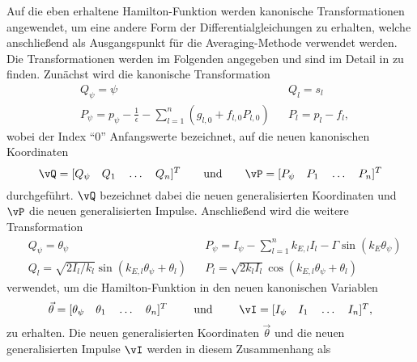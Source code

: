 %
%
%
Auf die eben erhaltene Hamilton-Funktion werden kanonische Transformationen angewendet, um eine andere Form der Differentialgleichungen zu erhalten,
welche anschließend als Ausgangspunkt für die Averaging-Methode verwendet werden.
Die Transformationen werden im Folgenden angegeben und sind im Detail in \cite{Mayet:Tautochronic} zu finden.
Zunächst wird die kanonische Transformation
%
%
\begin{align}
	&Q_{\psi} = \psi   																																									& & Q_l = s_l \label{eq:HamiltonErsteKanonischeTrafoGl1} \\
	&P_{\psi} = p_{\psi} - \frac{1}{\epsilon} - \sum_{l=1}^n \left(g_{l,0} + f_{l,0} P_{l,0} \right)		& & P_l = p_l - f_l,
	\label{eq:HamiltonErsteKanonischeTrafoGl2}
\end{align}
wobei der Index "`0"' Anfangswerte bezeichnet, auf die neuen kanonischen Koordinaten
\begin{equation}
	\vQ = [Q_{\psi} \quad Q_1 \quad \dots \quad Q_n]^T 	\qquad 	\text{und} 	\qquad 	\vP = [P_{\psi} \quad P_1 \quad \dots \quad P_n]^T
	\label{eq:HamiltonErsteKanonischeTrafoNeueVariablen}
\end{equation}
durchgeführt.
$\vQ$ bezeichnet dabei die neuen generalisierten Koordinaten und $\vP$ die neuen generalisierten Impulse. 
Anschließend wird die weitere Transformation
%
%
\begin{align}
	&Q_{\psi} 	= \theta_{\psi}   																									& & P_{\psi} = I_{\psi} - \sum_{l=1}^n k_{E,l} I_l - \Gamma \sin (k_E \theta_{\psi}) 
																																																\label{eq:HamiltonZweiteKanonischeTrafoGl1}\\
	&Q_l				= \sqrt{2 {I_l}/{k_l}} \sin (k_{E,l} \theta_{\psi} + \theta_l)		& & P_l = \sqrt{2 k_l I_l} \cos (k_{E,l} \theta_{\psi} + \theta_l)
	\label{eq:HamiltonZweiteKanonischeTrafoGl2}
\end{align}
verwendet, um die Hamilton-Funktion in den neuen kanonischen Variablen
\begin{equation}
		\vec{\theta} = [\theta_{\psi} \quad \theta_1 \quad \dots \quad \theta_n]^T$ 	\qquad 	\text{und} 	\qquad 	$\vI = [I_{\psi} \quad I_1 \quad \dots \quad I_n]^T,
	\label{eq:HamiltonZweiteKanonischeTrafoNeueVariablen}
\end{equation}
zu erhalten.
Die neuen generalisierten Koordinaten $\vec{\theta} $ und  die neuen generalisierten Impulse $\vI$ werden in diesem Zusammenhang als 
 \cite{Duistermaat:1980:ActionAngles}  
